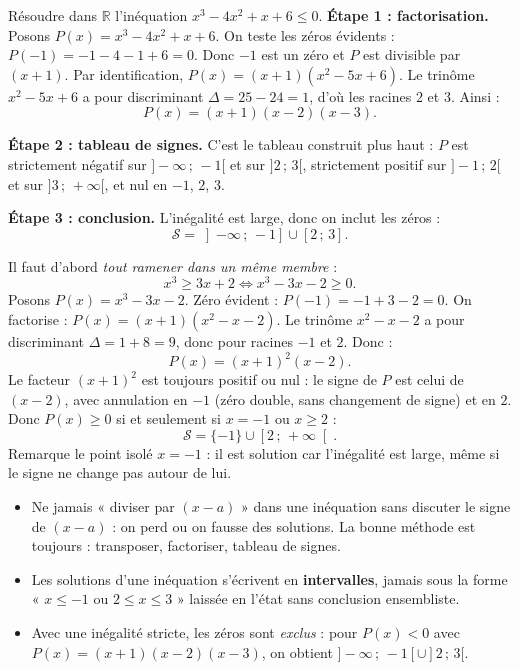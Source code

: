 \documentclass[11pt]{article}
\begin{document}
\begin{exoresolu}
Résoudre dans $\mathbb{R}$ l'inéquation $x^3 - 4x^2 + x + 6 \leq 0$.
\tcblower
\textbf{Étape 1 : factorisation.} Posons $P(x) = x^3 - 4x^2 + x + 6$. On teste les zéros évidents : $P(-1) = -1 - 4 - 1 + 6 = 0$. Donc $-1$ est un zéro et $P$ est divisible par $(x+1)$. Par identification, $P(x) = (x+1)(x^2 - 5x + 6)$. Le trinôme $x^2 - 5x + 6$ a pour discriminant $\Delta = 25 - 24 = 1$, d'où les racines $2$ et $3$. Ainsi :
\[ P(x) = (x+1)(x-2)(x-3). \]

\textbf{Étape 2 : tableau de signes.} C'est le tableau construit plus haut : $P$ est strictement négatif sur $]-\infty\,;\,-1[$ et sur $]2\,;\,3[$, strictement positif sur $]-1\,;\,2[$ et sur $]3\,;\,+\infty[$, et nul en $-1$, $2$, $3$.

\textbf{Étape 3 : conclusion.} L'inégalité est large, donc on inclut les zéros :
\[ \mathcal{S} = \left]-\infty\,;\,-1\right] \cup \left[2\,;\,3\right]. \]
\end{exoresolu}

\begin{exemplebox}
Il faut d'abord \emph{tout ramener dans un même membre} :
\[ x^3 \geq 3x + 2 \iff x^3 - 3x - 2 \geq 0. \]
Posons $P(x) = x^3 - 3x - 2$. Zéro évident : $P(-1) = -1 + 3 - 2 = 0$. On factorise : $P(x) = (x+1)(x^2 - x - 2)$. Le trinôme $x^2 - x - 2$ a pour discriminant $\Delta = 1 + 8 = 9$, donc pour racines $-1$ et $2$. Donc :
\[ P(x) = (x+1)^2(x-2). \]
Le facteur $(x+1)^2$ est toujours positif ou nul : le signe de $P$ est celui de $(x-2)$, avec annulation en $-1$ (zéro double, sans changement de signe) et en $2$. Donc $P(x) \geq 0$ si et seulement si $x = -1$ ou $x \geq 2$ :
\[ \mathcal{S} = \{-1\} \cup \left[2\,;\,+\infty\right[. \]
Remarque le point isolé $x = -1$ : il est solution car l'inégalité est large, même si le signe ne change pas autour de lui.
\end{exemplebox}

\begin{attention}
\begin{itemize}
\item Ne jamais « diviser par $(x - a)$ » dans une inéquation sans discuter le signe de $(x-a)$ : on perd ou on fausse des solutions. La bonne méthode est toujours : transposer, factoriser, tableau de signes.
\item Les solutions d'une inéquation s'écrivent en \textbf{intervalles}, jamais sous la forme « $x \leq -1$ ou $2 \leq x \leq 3$ » laissée en l'état sans conclusion ensembliste.
\item Avec une inégalité stricte, les zéros sont \emph{exclus} : pour $P(x) < 0$ avec $P(x) = (x+1)(x-2)(x-3)$, on obtient $]-\infty\,;\,-1[ \cup ]2\,;\,3[$.
\end{itemize}
\end{attention}
\end{document}
